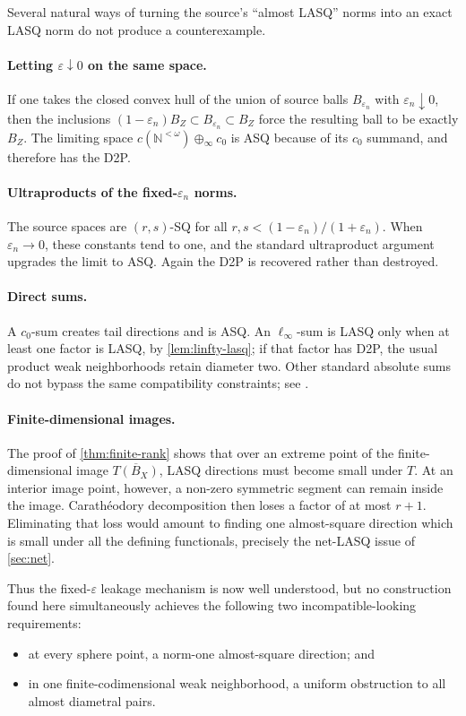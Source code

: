 \documentclass[11pt]{article}
\newcommand{\N}{\mathbb N}
\newcommand{\eps}{\varepsilon}
\begin{document}
Several natural ways of turning the source's ``almost LASQ'' norms into an exact LASQ norm do not produce a counterexample.

\paragraph{Letting $\eps\downarrow0$ on the same space.}
If one takes the closed convex hull of the union of source balls $B_{\eps_n}$ with $\eps_n\downarrow0$, then the inclusions $(1-\eps_n)B_Z\subset B_{\eps_n}\subset B_Z$ force the resulting ball to be exactly $B_Z$.  The limiting space $c(\N^{<\omega})\oplus_\infty c_0$ is ASQ because of its $c_0$ summand, and therefore has the D2P.

\paragraph{Ultraproducts of the fixed-$\eps_n$ norms.}
The source spaces are $(r,s)$-SQ for all $r,s<(1-\eps_n)/(1+\eps_n)$.  When $\eps_n\to0$, these constants tend to one, and the standard ultraproduct argument upgrades the limit to ASQ.  Again the D2P is recovered rather than destroyed.

\paragraph{Direct sums.}
A $c_0$-sum creates tail directions and is ASQ.  An $\ell_\infty$-sum is LASQ only when at least one factor is LASQ, by \cref{lem:linfty-lasq}; if that factor has D2P, the usual product weak neighborhoods retain diameter two.  Other standard absolute sums do not bypass the same compatibility constraints; see \cite{Hardtke2018}.

\paragraph{Finite-dimensional images.}
The proof of \cref{thm:finite-rank} shows that over an extreme point of the finite-dimensional image $\overline{T(B_X)}$, LASQ directions must become small under $T$.  At an interior image point, however, a non-zero symmetric segment can remain inside the image.  Carath\'eodory decomposition then loses a factor of at most $r+1$.  Eliminating that loss would amount to finding one almost-square direction which is small under all the defining functionals, precisely the net-LASQ issue of \cref{sec:net}.

Thus the fixed-$\eps$ leakage mechanism is now well understood, but no construction found here simultaneously achieves the following two incompatible-looking requirements:
\begin{itemize}
\item at every sphere point, a norm-one almost-square direction; and
\item in one finite-codimensional weak neighborhood, a uniform obstruction to all almost diametral pairs.
\end{itemize}
\end{document}
